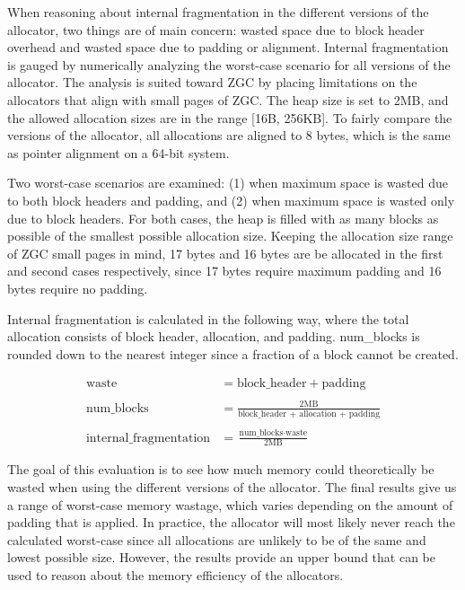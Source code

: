 When reasoning about internal fragmentation in the different versions of the allocator, two things are of main concern: wasted space due to block header overhead and wasted space due to padding or alignment. Internal fragmentation is gauged by numerically analyzing the worst-case scenario for all versions of the allocator. The analysis is suited toward ZGC by placing limitations on the allocators that align with small pages of ZGC. The heap size is set to 2MB, and the allowed allocation sizes are in the range [16B, 256KB]. To fairly compare the versions of the allocator, all allocations are aligned to 8 bytes, which is the same as pointer alignment on a 64-bit system.

Two worst-case scenarios are examined: (1) when maximum space is wasted due to both block headers and padding, and (2) when maximum space is wasted only due to block headers. For both cases, the heap is filled with as many blocks as possible of the smallest possible allocation size. Keeping the allocation size range of ZGC small pages in mind, 17 bytes and 16 bytes are be allocated in the first and second cases respectively, since 17 bytes require maximum padding and 16 bytes require no padding.

Internal fragmentation is calculated in the following way, where the total allocation consists of block header, allocation, and padding. num\_blocks is rounded down to the nearest integer since a fraction of a block cannot be created.

\begin{align*}
    \text{waste} &= \text{block\_header} + \text{padding} \\\\
    \text{num\_blocks} &= \frac{2\text{MB}}{\text{block\_header + allocation + padding}} \\\\
    \text{internal\_fragmentation} &= \frac{\text{num\_blocks} \cdot \text{waste}}{2\text{MB}}
\end{align*}

The goal of this evaluation is to see how much memory could theoretically be wasted when using the different versions of the allocator. The final results give us a range of worst-case memory wastage, which varies depending on the amount of padding that is applied. In practice, the allocator will most likely never reach the calculated worst-case since all allocations are unlikely to be of the same and lowest possible size. However, the results provide an upper bound that can be used to reason about the memory efficiency of the allocators.

